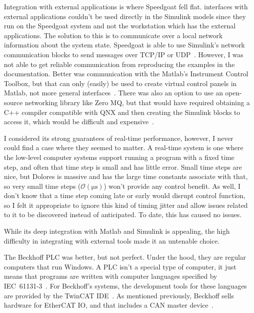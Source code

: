\documentclass[english,12pt,a4paper,pdftex,eng,utf8]{aaltothesis}
\begin{document}
Integration with external applications is where Speedgoat fell flat.  interfaces with external applications couldn't be used directly in the Simulink models since they run on the Speedgoat system and not the workstation which has the external applications.  The solution to this is to communicate over a local network information about the system state.  Speedgoat is able to use Simulink's network communication blocks to send messages over TCP/IP or UDP~\cite{SimulinkNetworkComms}.  However, I was not able to get reliable communication from reproducing the examples in the documentation.  Better was communication with the Matlab's Instrument Control Toolbox, but that can only (easily) be used to create virtual control panels in Matlab, not more general interfaces~\cite{SimulinkInstrument}.  There was also an option to use an open-source networking library like Zero MQ, but that would have required obtaining a C++ compiler compatible with QNX and then creating the Simulink blocks to access it, which would be difficult and expensive~\cite{ZeroMQ}.

I considered its strong guarantees of real-time performance, however, I never could find a case where they seemed to matter.  A real-time system is one where the low-level computer systems support running a program with a fixed time step, and often that time step is small and has little error.  Small time steps are nice, but Dolores is massive and has the large time constants associate with that, so very small time steps ($\mathcal{O}(\unit{\micro\second})$) won't provide any control benefit.  As well, I don't know that a time step coming late or early would disrupt control function, so I felt it appropriate to ignore this kind of timing jitter and allow issues related to it to be discovered instead of anticipated.  To date, this has caused no issues.

While its deep integration with Matlab and Simulink is appealing, the high difficulty in integrating with external tools made it an untenable choice.

The Beckhoff PLC was better, but not perfect.  Under the hood, they are regular computers that run Windows.  A PLC isn't a special type of computer, it just means that programs are written with computer languages specified by \mbox{IEC 61131-3}~\cite{IEC61131-3}.  For Beckhoff's systems, the development tools for these languages are provided by the TwinCAT IDE~\cite{BeckhoffTwinCAT}.  As mentioned previously, Beckhoff sells hardware for EtherCAT IO, and that includes a CAN master device~\cite{BeckhoffEL6751}.
\end{document}
